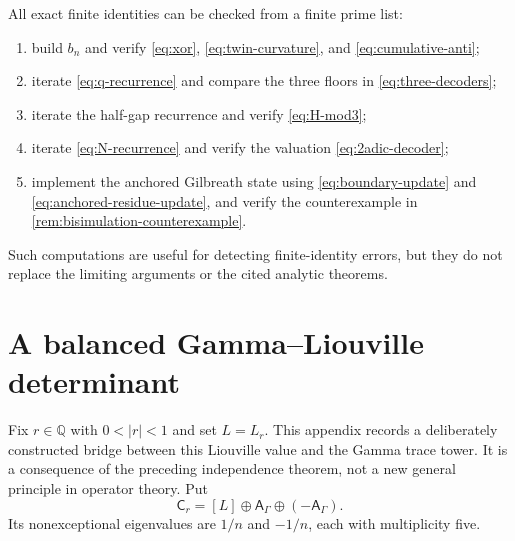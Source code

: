 \documentclass[11pt]{article}
\theoremstyle{definition}
\theoremstyle{remark}
\begin{document}
All exact finite identities can be checked from a finite prime list:
\begin{enumerate}
 \item build $b_n$ and verify \eqref{eq:xor}, \eqref{eq:twin-curvature}, and
 \eqref{eq:cumulative-anti};
 \item iterate \eqref{eq:q-recurrence} and compare the three floors in
 \eqref{eq:three-decoders};
 \item iterate the half-gap recurrence and verify \eqref{eq:H-mod3};
 \item iterate \eqref{eq:N-recurrence} and verify the valuation
 \eqref{eq:2adic-decoder};
 \item implement the anchored Gilbreath state using \eqref{eq:boundary-update} and
 \eqref{eq:anchored-residue-update}, and verify the counterexample in
 \cref{rem:bisimulation-counterexample}.
\end{enumerate}
Such computations are useful for detecting finite-identity errors, but they do not replace
the limiting arguments or the cited analytic theorems.

\section{A balanced Gamma--Liouville determinant}

Fix $r\in\mathbb Q$ with $0<|r|<1$ and set $L=L_r$.  This appendix records a
deliberately constructed bridge between this Liouville value and the Gamma trace tower.
It is a consequence of the preceding independence theorem, not a new general principle
in operator theory.  Put
\[
 \mathsf C_r=[L]\oplus\mathsf A_\Gamma\oplus(-\mathsf A_\Gamma).
\]
Its nonexceptional eigenvalues are $1/n$ and $-1/n$, each with multiplicity five.
\end{document}
